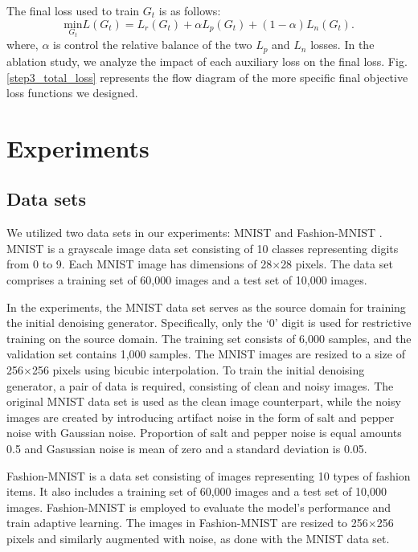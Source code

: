 \documentclass[lettersize,journal]{IEEEtran}
\begin{document}
The final loss used to train $G_t$ is as follows:
\begin{equation}
\label{final_loss}
\underset {G_t} {\text{min}} L(G_t) = L_r(G_t)+ \alpha L_p(G_t) + (1-\alpha) L_{n}(G_t).
\end{equation}
where, $\alpha$ is control the relative balance of the two $L_p$ and $L_n$ losses. In the ablation study, we analyze the impact of each auxiliary loss on the final loss. Fig. \ref{step3_total_loss} represents the flow diagram of the more specific final objective loss functions we designed.

\section{Experiments}

\subsection{Data sets}
We utilized two data sets in our experiments: MNIST \cite{lecun1998gradient} and Fashion-MNIST \cite{xiao2017fashion}. MNIST is a grayscale image data set consisting of 10 classes representing digits from 0 to 9. Each MNIST image has dimensions of 28$\times$28 pixels. The data set comprises a training set of 60,000 images and a test set of 10,000 images.

In the experiments, the MNIST data set serves as the source domain for training the initial denoising generator. Specifically, only the `0' digit is used for restrictive training on the source domain. The training set consists of 6,000 samples, and the validation set contains 1,000 samples. The MNIST images are resized to a size of 256$\times$256 pixels using bicubic interpolation. To train the initial denoising generator, a pair of data is required, consisting of clean and noisy images. The original MNIST data set is used as the clean image counterpart, while the noisy images are created by introducing artifact noise in the form of salt and pepper noise with Gaussian noise. Proportion of salt and pepper noise is equal amounts 0.5 and Gasussian noise is mean of zero and a standard deviation is 0.05.

Fashion-MNIST is a data set consisting of images representing 10 types of fashion items. It also includes a training set of 60,000 images and a test set of 10,000 images. Fashion-MNIST is employed to evaluate the model's performance and train adaptive learning. The images in Fashion-MNIST are resized to 256$\times$256 pixels and similarly augmented with noise, as done with the MNIST data set. 
\end{document}
